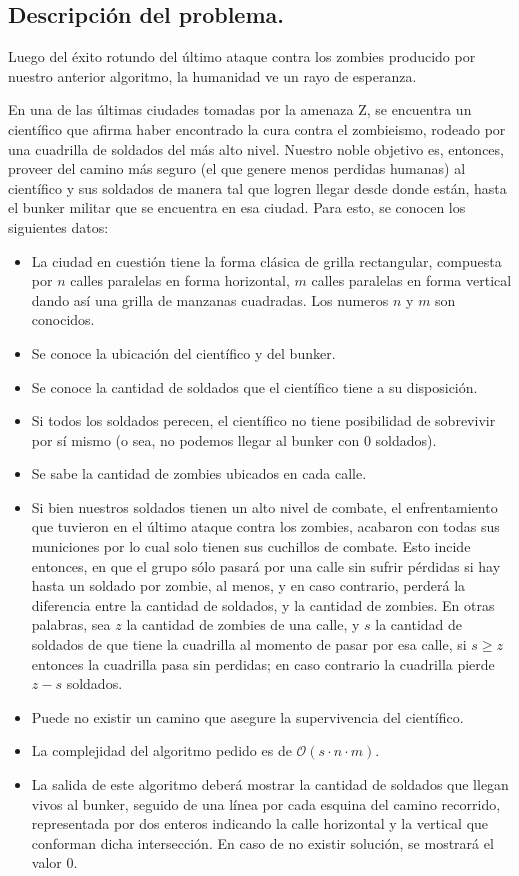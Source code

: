 \subsection{Descripción del problema.}

\vspace*{0.3cm}

Luego del éxito rotundo del último ataque contra los zombies producido por nuestro anterior algoritmo, la humanidad ve un rayo de esperanza.

En una de las últimas ciudades tomadas por la amenaza Z, se encuentra un científico que afirma haber encontrado la cura contra el zombieismo, rodeado por una cuadrilla de soldados del más alto nivel. Nuestro noble objetivo es, entonces, proveer del camino más seguro (el que genere menos perdidas humanas) al científico y sus soldados de manera tal que logren llegar desde donde están, hasta el bunker militar que se encuentra en esa ciudad. Para esto, se conocen los siguientes datos:

\begin{itemize}
	\item La ciudad en cuestión tiene la forma clásica de grilla rectangular, compuesta por $n$ calles paralelas en forma horizontal, $m$ calles paralelas en forma vertical dando así una grilla de manzanas cuadradas. Los numeros $n$ y $m$ son conocidos.
	\item Se conoce la ubicación del científico y del bunker.
	\item Se conoce la cantidad de soldados que el científico tiene a su disposición.
	\item Si todos los soldados perecen, el científico no tiene posibilidad de sobrevivir por sí mismo (o sea, no podemos llegar al bunker con 0 soldados).
	\item Se sabe la cantidad de zombies ubicados en cada calle.
	\item Si bien nuestros soldados tienen un alto nivel de combate, el enfrentamiento que tuvieron en el último ataque contra los zombies, acabaron con todas sus municiones por lo cual solo tienen sus cuchillos de combate. Esto incide entonces, en que el grupo sólo pasará por una calle sin sufrir pérdidas si hay hasta un soldado por zombie, al menos, y en caso contrario, perderá la diferencia entre la cantidad de soldados, y la cantidad de zombies. En otras palabras, sea $z$ la cantidad de zombies de una calle, y $s$ la cantidad de soldados de que tiene la cuadrilla al momento de pasar por esa calle, si $s \geq z$ entonces la cuadrilla pasa sin perdidas; en caso contrario la cuadrilla pierde $z - s$ soldados.
	\item Puede no existir un camino que asegure la supervivencia del científico.
	\item La complejidad del algoritmo pedido es de $\mathcal{O}(s \cdot n \cdot m)$.
	\item La salida de este algoritmo deberá mostrar la cantidad de soldados que llegan vivos al bunker, seguido de una línea por cada esquina del camino recorrido, representada por dos enteros indicando la calle horizontal y la vertical que conforman dicha intersección.  En caso de no existir solución, se mostrará el valor 0. 
\end{itemize}

